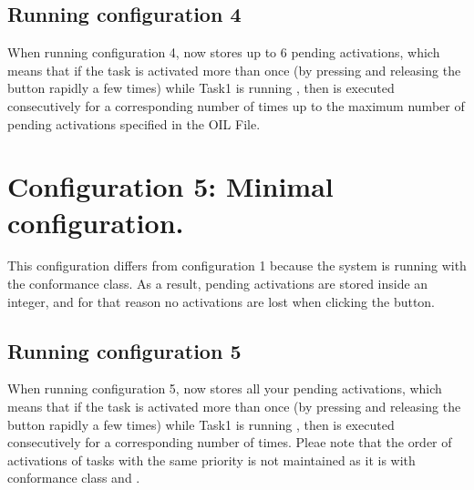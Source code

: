 \subsection{Running configuration 4}
When running configuration 4,  now stores up to 6 pending
activations, which means that if the task is activated more than once
(by pressing and releasing the button rapidly a few times) while Task1
is running , then  is executed consecutively for a
corresponding number of times up to the maximum number of pending
activations specified in the OIL File.

\section{Configuration 5: Minimal configuration.}
This configuration differs from configuration 1 because the system is running with the  conformance class. As a result, pending activations are stored inside an integer, and for that reason no activations are lost when clicking the button.

\subsection{Running configuration 5}
When running configuration 5,  now stores all your pending
activations, which means that if the task is activated more than once
(by pressing and releasing the button rapidly a few times) while Task1
is running , then  is executed consecutively for a
corresponding number of times. Pleae note that the order of
activations of tasks with the same priority is not maintained as it is with conformance class  and .
